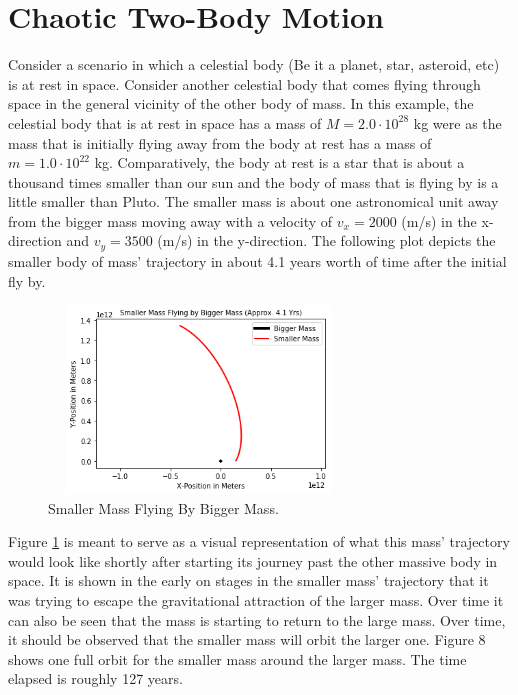 \documentclass[twocolumn]{article}
\begin{document}
\section{Chaotic Two-Body Motion}
Consider a scenario in which a celestial body (Be it a planet, star, asteroid, etc) is at rest in space. Consider another celestial body that comes flying through space in the general vicinity of the other body of mass. In this example, the celestial body that is at rest in space has a mass of $M=2.0\cdot10^{28}$ kg were as the mass that is initially flying away from the body at rest has a mass of $m=1.0\cdot10^{22}$ kg. Comparatively, the body at rest is a star that is about a thousand times smaller than our sun and the body of mass that is flying by is a little smaller than Pluto. The smaller mass is about one astronomical unit away from the bigger mass moving away with a velocity of $v_{x}=2000$ (m/s) in the x-direction and $v_{y}=3500$ (m/s) in the y-direction. The following plot depicts the smaller body of mass' trajectory in about 4.1 years worth of time after the initial fly by.
\begin{figure}[ht]
    \centering
    \includegraphics[width=8cm, height=5cm]{Figures/2-Body Fly By (1).png}
    \caption{\small{Smaller Mass Flying By Bigger Mass.}}
    \label{Fig. 2 Body Fly By Fig. 1}
\end{figure}
\par \noindent
Figure \ref{Fig. 2 Body Fly By Fig. 1} is meant to serve as a visual representation of what this mass' trajectory would look like shortly after starting its journey past the other massive body in space. It is shown in the early on stages in the smaller mass' trajectory that it was trying to escape the gravitational attraction of the larger mass. Over time it can also be seen that the mass is starting to return to the large mass. Over time, it should be observed that the smaller mass will orbit the larger one. Figure 8 shows one full orbit for the smaller mass around the larger mass. The time elapsed is roughly 127 years.
\end{document}
